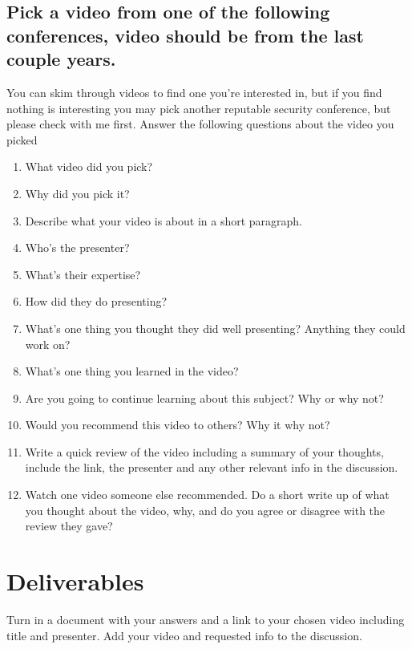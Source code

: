 \documentclass[12pt]{article}
\begin{document}
\subsection*{Pick a video from one of the following conferences, video should be from the last couple years.}
You can skim through videos to find one you're interested in, but if you find nothing is interesting you may pick another reputable security conference, but please check with me first. Answer the following questions about the video you picked
    \begin{enumerate}
        \item What video did you pick?
        \item Why did you pick it?
        \item Describe what your video is about in a short paragraph.
        \item Who's the presenter?
        \item What's their expertise?
        \item How did they do presenting?
        \item What's one thing you thought they did well presenting? Anything they could work on?
        \item What's one thing you learned in the video?
        \item Are you going to continue learning about this subject? Why or why not? 
        \item Would you recommend this video to others? Why it why not?
        \item Write a quick review of the video including a summary of your thoughts, include the link, the presenter and any other relevant info in the discussion.
        \item Watch one video someone else recommended. Do a short write up of what you thought about the video, why, and do you agree or disagree with the review they gave?
    \end{enumerate}



\section*{Deliverables}
Turn in a document with your answers and a link to your chosen video including title and presenter.  Add your video and requested info to the discussion.
\end{document}

